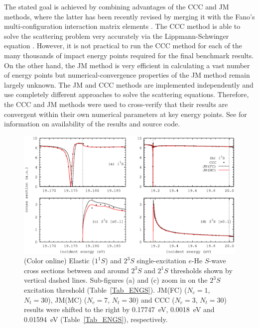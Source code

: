 \documentclass[aip
, pra
, showpacs
, aps
, twocolumn
, groupedaddress
, floatfix
]{revtex4}
\begin{document}
The stated goal is achieved by combining advantages of the CCC and JM methods,
where the latter has been recently revised \cite{KFB11} by merging it with the Fano's multi-configuration interaction matrix elements \cite{Fano65}.
The CCC method is able to solve the scattering problem very accurately via the Lippmann-Schwinger equation \cite{BS92p6995}.
However, it is not practical to run the CCC method for each of the many thousands of impact energy points required for the final benchmark results.
On the other hand, the JM method is very efficient \cite{HY74p1201,BR76p1491} in calculating a vast number of energy points
but numerical-convergence properties of the JM method remain largely unknown.
The JM and CCC methods are implemented independently and use completely different approaches to solve the scattering equations.
Therefore, the CCC and JM methods were used to cross-verify that their results are convergent within their own numerical parameters at key energy points.
See \cite{JMatrixWebsite} for information on availability of the results and source code.


\begin{figure}[htb]
\includegraphics[scale=1]{fig1.ps}
\caption{(Color online) Elastic ($1^1S$) and
$2^3S$ single-excitation $e$-He $S$-wave cross sections between and around $2^3S$ and $2^1S$ thresholds shown by vertical dashed lines.
Sub-figures (a) and (c) zoom in on the $2^3S$ excitation threshold (Table~\ref{Tab_ENGS}).
JM(FC) ($N_c=1$, $N_t=30$), JM(MC) ($N_c=7$, $N_t=30$) and CCC ($N_c=3$, $N_t=30$) results  were shifted to the right by 0.17747~eV, 0.0018~eV
and 0.01594~eV (Table~\ref{Tab_ENGS}), respectively.
}
\label{Fig_1}
\end{figure}
\end{document}
